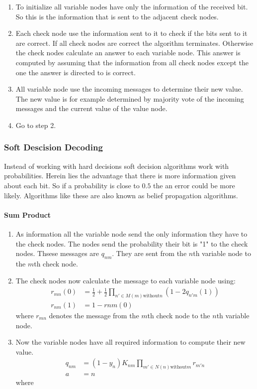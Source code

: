 \begin{enumerate}
	\item To initialize all variable nodes have only the information of the received bit. So this is the information that is sent to the adjacent check nodes.
	\item Each check node use the information sent to it to check if the bits sent to it are correct. If all check nodes are correct the algorithm terminates. Otherwise the check nodes calculate an answer to each variable node. This answer is computed by assuming that the information from all check nodes except the one the answer is directed to is correct.
	\item All variable node use the incoming messages to determine their new value. The new value is for example determined by majority vote of the incoming messages and the current value of the value node.
	\item Go to step 2.
\end{enumerate}

\subsubsection{Soft Descision Decoding}
Instead of working with hard decisions soft decision algorithms work with probabilities. Herein lies the advantage that there is more information given about each bit. So if a probability is close to $0.5$ the an error could be more likely. Algorithms like these are also known as belief propagation algorithms.

\paragraph{Sum Product}
\begin{enumerate}
	\item As information all the variable node send the only information they have to the check nodes. The nodes send the probability their bit is "1" to the check nodes. Thsese messages are $q_{nm}$. They are sent from the $n$th variable node to the $m$th check node.
	\item The check nodes now calculate the message to each variable node using:
		\begin{align*}
			r_{mn}(0) & = \frac{1}{2} + \frac{1}{2} \prod_{n' \in M(m) \text{without} n}\left(1 - 2 q_{n'm}(1)\right) \\
			r_{nm}(1) & = 1 - r{nm}(0)
		\end{align*}
		where $r_{mn}$ denotes the message from the $m$th check node to the $n$th variable node.
	\item Now the variable nodes have all required information to compute their new value.
		\begin{align*}
			q_{nm} & = (1 - y_n) K_{nm} \prod_{m' \in N(n) \text{without} m}r_{m'n} \\
			a & = n
		\end{align*}
		where 
\end{enumerate}

